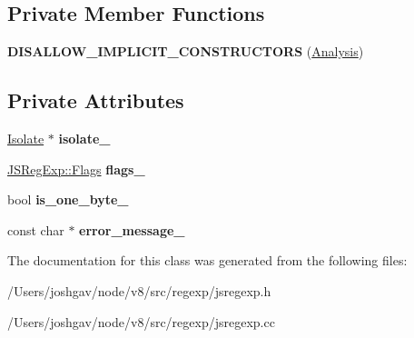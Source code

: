 \subsection*{Private Member Functions}
\begin{DoxyCompactItemize}
\item 
{\bfseries D\+I\+S\+A\+L\+L\+O\+W\+\_\+\+I\+M\+P\+L\+I\+C\+I\+T\+\_\+\+C\+O\+N\+S\+T\+R\+U\+C\+T\+O\+RS} (\hyperlink{classv8_1_1internal_1_1_analysis}{Analysis})\hypertarget{classv8_1_1internal_1_1_analysis_a5644d696a2169bb5eb1fdec268fccd23}{}\label{classv8_1_1internal_1_1_analysis_a5644d696a2169bb5eb1fdec268fccd23}

\end{DoxyCompactItemize}
\subsection*{Private Attributes}
\begin{DoxyCompactItemize}
\item 
\hyperlink{classv8_1_1internal_1_1_isolate}{Isolate} $\ast$ {\bfseries isolate\+\_\+}\hypertarget{classv8_1_1internal_1_1_analysis_adb4ca99ba3a828a0e9f8447b928d505f}{}\label{classv8_1_1internal_1_1_analysis_adb4ca99ba3a828a0e9f8447b928d505f}

\item 
\hyperlink{classv8_1_1base_1_1_flags}{J\+S\+Reg\+Exp\+::\+Flags} {\bfseries flags\+\_\+}\hypertarget{classv8_1_1internal_1_1_analysis_a17c7794660581032c28b72c4d1431710}{}\label{classv8_1_1internal_1_1_analysis_a17c7794660581032c28b72c4d1431710}

\item 
bool {\bfseries is\+\_\+one\+\_\+byte\+\_\+}\hypertarget{classv8_1_1internal_1_1_analysis_afe88275e82e128eb4f84ad51b9b6d71f}{}\label{classv8_1_1internal_1_1_analysis_afe88275e82e128eb4f84ad51b9b6d71f}

\item 
const char $\ast$ {\bfseries error\+\_\+message\+\_\+}\hypertarget{classv8_1_1internal_1_1_analysis_abe0c372b8260ec967c145a7de7e6f71b}{}\label{classv8_1_1internal_1_1_analysis_abe0c372b8260ec967c145a7de7e6f71b}

\end{DoxyCompactItemize}


The documentation for this class was generated from the following files\+:\begin{DoxyCompactItemize}
\item 
/\+Users/joshgav/node/v8/src/regexp/jsregexp.\+h\item 
/\+Users/joshgav/node/v8/src/regexp/jsregexp.\+cc\end{DoxyCompactItemize}
